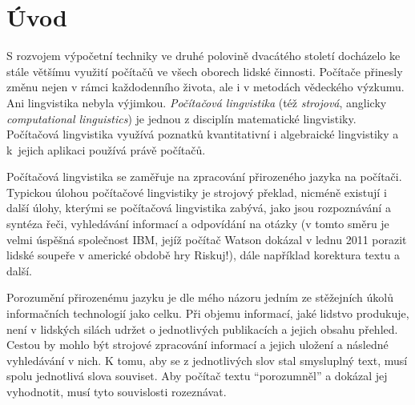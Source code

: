 \documentclass[dp.tex]{subfiles}
\begin{document}
\chapter*{Úvod}
\label{chap:uvod} 






S rozvojem výpočetní techniky ve druhé polovině dvacátého století docházelo ke stále většímu využití počítačů ve všech oborech lidské činnosti. Počítače přinesly změnu nejen v rámci každodenního života, ale i v metodách vědeckého výzkumu. Ani lingvistika nebyla výjimkou. \textit{Počítačová lingvistika} (též \textit{strojová}, anglicky \textit{computational linguistics}) je jednou z disciplín matematické lingvistiky. Počítačová lingvistika využívá poznatků kvantitativní i algebraické lingvistiky a k~jejich aplikaci používá právě počítačů. 

Počítačová lingvistika se zaměřuje na zpracování přirozeného jazyka na počítači. Typickou úlohou počítačové lingvistiky je strojový překlad, nicméně existují i další úlohy, kterými se počítačová lingvistika zabývá, jako jsou rozpoznávání a syntéza řeči, vyhledávání informací a odpovídání na otázky (v tomto směru je velmi úspěšná společnost IBM, jejíž počítač Watson dokázal v lednu 2011 porazit lidské soupeře v americké obdobě hry Riskuj!), dále například korektura textu a další.

Porozumění přirozenému jazyku je dle mého názoru jedním ze stěžejních úkolů informačních technologií jako celku. Při objemu informací, jaké lidstvo produkuje, není v lidských silách udržet o jednotlivých publikacích a jejich obsahu přehled. Cestou by mohlo být strojové zpracování informací a jejich uložení a následné vyhledávání v nich. K tomu, aby se z jednotlivých slov stal smysluplný text, musí spolu jednotlivá slova souviset. Aby počítač textu \enquote{porozumněl} a dokázal jej vyhodnotit, musí tyto souvislosti rozeznávat.
\end{document}
